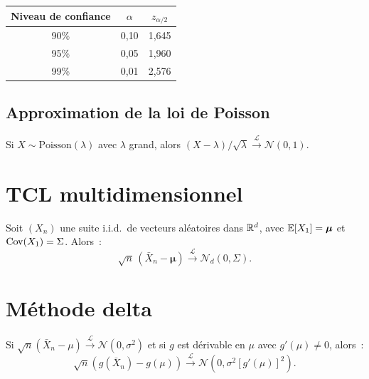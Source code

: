 \begin{formules}[title=\textbf{Quantiles courants pour les IC}]
\begin{center}
\renewcommand{\arraystretch}{1.3}
\begin{tabular}{ccc}
    \toprule
    Niveau de confiance & $\alpha$ & $z_{\alpha/2}$ \\
    \midrule
    90\% & 0{,}10 & 1{,}645 \\
    95\% & 0{,}05 & 1{,}960 \\
    99\% & 0{,}01 & 2{,}576 \\
    \bottomrule
\end{tabular}
\end{center}
\end{formules}

\subsection{Approximation de la loi de Poisson}

\begin{corollaire}
Si $X \sim \text{Poisson}(\lambda)$ avec $\lambda$ grand, alors
$(X - \lambda)/\sqrt{\lambda} \xrightarrow{\mathcal{L}} \mathcal{N}(0,1)$.
\end{corollaire}

\section{TCL multidimensionnel}

\begin{theoreme}
Soit $(X_n)$ une suite i.i.d.\ de vecteurs al\'eatoires dans $\mathbb{R}^d$, avec
$\mathbb{E}[X_1] = \boldsymbol{\mu}$ et $\mathrm{Cov}(X_1) = \Sigma$. Alors~:
\[
    \sqrt{n}\,(\bar{X}_n - \boldsymbol{\mu})
    \xrightarrow{\mathcal{L}} \mathcal{N}_d(0, \Sigma).
\]
\end{theoreme}

\section{M\'ethode delta}

\begin{theoreme}
\label{thm:delta}
Si $\sqrt{n}(\bar{X}_n - \mu) \xrightarrow{\mathcal{L}} \mathcal{N}(0, \sigma^2)$
et si $g$ est d\'erivable en $\mu$ avec $g'(\mu) \neq 0$, alors~:
\[
    \sqrt{n}(g(\bar{X}_n) - g(\mu))
    \xrightarrow{\mathcal{L}} \mathcal{N}(0, \sigma^2 [g'(\mu)]^2).
\]
\end{theoreme}


